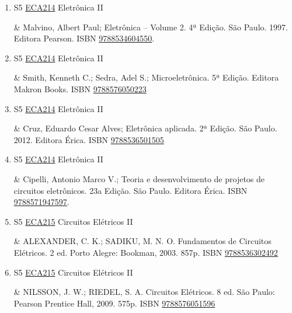 \documentclass[12pt,a4paper]{book}
\begin{document}
\begin{enumerate}
 \item S5 \hyperref[PUD:ECA214]{ECA214} Eletrônica II

& Malvino, Albert Paul;  Eletrônica – Volume 2.  4ª Edição.  São Paulo.  1997.  Editora Pearson.  ISBN \href{http://www.bn.br/site/pages/servicosProfissionais/agenciaISBN/isbnBusca/FbnBuscaISBNCatalogo.asp?pField=ISBN&pIntPagina=1&pISBN=34604550&nidbISBN=true&hidbISBN=true}{9788534604550}.
 \item S5 \hyperref[PUD:ECA214]{ECA214} Eletrônica II

& Smith, Kenneth C.;  Sedra, Adel S.;  Microeletrônica.  5ª Edição.  Editora Makron Books.  ISBN \href{http://www.bn.br/site/pages/servicosProfissionais/agenciaISBN/isbnBusca/FbnBuscaISBNCatalogo.asp?pField=ISBN&pIntPagina=1&pISBN=76050223&nidbISBN=true&hidbISBN=true}{9788576050223}
 

 \item S5 \hyperref[PUD:ECA214]{ECA214} Eletrônica II

& Cruz, Eduardo Cesar Alves;  Eletrônica aplicada.  2ª Edição.  São Paulo.  2012.  Editora Érica.  ISBN \href{http://www.bn.br/site/pages/servicosProfissionais/agenciaISBN/isbnBusca/FbnBuscaISBNCatalogo.asp?pField=ISBN&pIntPagina=1&pISBN=36501505&nidbISBN=true&hidbISBN=true}{9788536501505}
 

 \item S5 \hyperref[PUD:ECA214]{ECA214} Eletrônica II

& Cipelli, Antonio Marco V.;  Teoria e desenvolvimento de projetos de circuitos eletrônicos.  23a Edição.  São Paulo.  Editora Érica.  ISBN \href{http://www.bn.br/site/pages/servicosProfissionais/agenciaISBN/isbnBusca/FbnBuscaISBNCatalogo.asp?pField=ISBN&pIntPagina=1&pISBN=71947597&nidbISBN=true&hidbISBN=true}{9788571947597}.
 \item S5 \hyperref[PUD:ECA215]{ECA215} Circuitos Elétricos II

& ALEXANDER, C.  K.;  SADIKU, M.  N.  O.  Fundamentos de Circuitos Elétricos.  2 ed. 
Porto Alegre: Bookman, 2003.  857p.  ISBN \href{http://www.bn.br/site/pages/servicosProfissionais/agenciaISBN/isbnBusca/FbnBuscaISBNCatalogo.asp?pField=ISBN&pIntPagina=1&pISBN=36302492&nidbISBN=true&hidbISBN=true}{9788536302492}
 

 \item S5 \hyperref[PUD:ECA215]{ECA215} Circuitos Elétricos II

&  NILSSON, J.  W.;  RIEDEL, S.  A.  Circuitos Elétricos.  8 ed.  São Paulo: Pearson 
Prentice Hall, 2009.  575p.  ISBN \href{http://www.bn.br/site/pages/servicosProfissionais/agenciaISBN/isbnBusca/FbnBuscaISBNCatalogo.asp?pField=ISBN&pIntPagina=1&pISBN=76051596&nidbISBN=true&hidbISBN=true}{9788576051596}
 


\end{enumerate}
\end{document}
